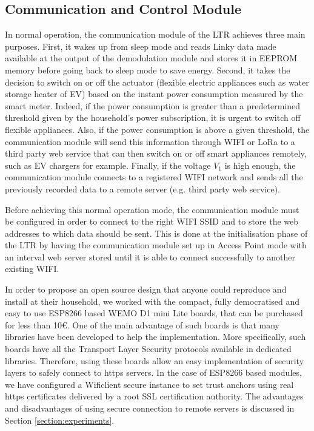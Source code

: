 \documentclass[conference]{IEEEtran}
\begin{document}
 \subsection{Communication and Control Module}
 In normal operation, the communication module of the LTR achieves three main purposes. First, it wakes up from sleep mode and reads  Linky data made available at the output of the demodulation module and stores it in EEPROM memory before going back to sleep mode to save energy. Second, it takes the decision to switch on or off the actuator (flexible electric appliances such as water storage heater of EV) based on the instant power consumption  measured by the smart meter. Indeed, if the power consumption is greater than a predetermined threshold given by the household's power subscription, it is urgent to switch off flexible appliances. Also, if the power consumption is above a given threshold, the communication module will send this information through WIFI or LoRa to a third party web service that can then switch on or off smart appliances remotely, such as EV chargers for example. Finally, if the voltage $V_1$ is high enough, the communication module connects to a registered WIFI network and sends 	all the previously recorded data to a remote server (e.g. third party web service).  
 
 Before achieving this normal operation mode, the communication module must be configured in order to connect to the right WIFI SSID and to store the web addresses to which data should be sent. This is done at the initialisation phase of the LTR by having the communication module set up in Access Point mode with an interval web server stored until it is able to connect successfully to another existing WIFI. 
 
 In order to propose an open source design that anyone could reproduce and install at their household, we worked with the compact, fully democratised and easy to use ESP8266 based WEMO D1 mini Lite boards, that can be purchased for less than 10€. One of the main advantage of such boards is that many libraries have been developed to help the implementation. More specifically, such boards have all the Transport Layer Security protocols available in dedicated libraries. Therefore, using these boards allow an easy implementation of security layers to safely connect to https servers. In the case of ESP8266 based modules, we have configured a Wificlient secure instance to set trust anchors using real https  certificates delivered by a root SSL certification authority. The advantages and disadvantages of using secure connection to remote servers is discussed in Section \ref{section:experiments}.
 
\end{document}

